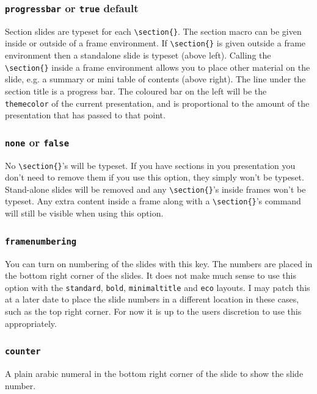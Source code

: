 \documentclass[a4paper,oneside,11pt]{article}
\newcommand{\key}[1]{\texttt{\color{UOWorange}#1}}
\newcommand{\val}[1]{\texttt{\color{UOWblue}#1}}
\newcommand{\command}[1]{\texttt{\color{UOWdarkgreen}#1}}
\begin{document}
\subsubsection*{\val{progressbar} or \val{true} default}
Section slides are typeset for each \command{\textbackslash{}section\{\}}. The section macro can be given inside or outside of a frame environment. If \command{\textbackslash{}section\{\}} is given outside a frame environment then a standalone slide is typeset (above left). Calling the \command{\textbackslash{}section\{\}} inside a frame environment allows you to place other material on the slide, e.g. a summary or mini table of contents (above right). The line under the section title is a progress bar. The coloured bar on the left will be the \key{themecolor} of the current presentation, and is proportional to the amount of the presentation that has passed to that point.

\subsubsection*{\val{none} or \val{false}}
No \command{\textbackslash{}section\{\}}'s will be typeset. If you have sections in you presentation you don't need to remove them if you use this option, they simply won't be typeset. Stand-alone slides will be removed and any \command{\textbackslash{}section\{\}}'s inside frames won't be typeset. Any extra content inside a frame along with a \command{\textbackslash{}section\{\}}'s command will still be visible when using this option.


\subsubsection*{\key{framenumbering}}
You can turn on numbering of the slides with this key. The numbers are placed in the bottom right corner of the slides. It does not make much sense to use this option with the \val{standard}, \val{bold}, \val{minimaltitle} and \val{eco} layouts. I may patch this at a later date to place the slide numbers in a different location in these cases, such as the top right corner. For now it is up to the users discretion to use this appropriately.

\subsubsection*{\val{counter}}
A plain arabic numeral in the bottom right corner of the slide to show the slide number.
\end{document}
